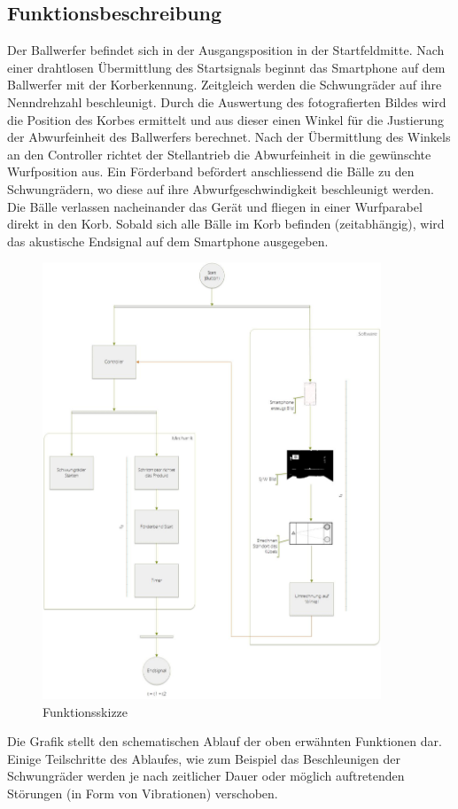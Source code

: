 \subsection{Funktionsbeschreibung}
Der Ballwerfer befindet sich in der Ausgangsposition in der Startfeldmitte. Nach einer drahtlosen Übermittlung des Startsignals beginnt das Smartphone auf dem Ballwerfer mit der Korberkennung. Zeitgleich werden die Schwungräder auf ihre Nenndrehzahl beschleunigt. Durch die Auswertung des fotografierten Bildes wird die Position des Korbes ermittelt und aus dieser einen Winkel für die Justierung der Abwurfeinheit des Ballwerfers berechnet. Nach der Übermittlung des Winkels an den Controller richtet der Stellantrieb die Abwurfeinheit in die gewünschte Wurfposition aus. Ein Förderband befördert anschliessend die Bälle zu den Schwungrädern, wo diese auf ihre Abwurfgeschwindigkeit beschleunigt werden. Die Bälle verlassen nacheinander das Gerät und fliegen in einer Wurfparabel direkt in den Korb. Sobald sich alle Bälle im Korb befinden (zeitabhängig), wird das akustische Endsignal auf dem Smartphone ausgegeben.
\begin{figure}[h!]
	\centering
	\includegraphics[width=0.9\textwidth]{Enddokumentation/Loesungskonzept/Bilder/FlowOnChart_v2.jpg}
	\caption{Funktionsskizze}
	\label{fig:FlowChart}
\end{figure}
Die Grafik stellt den schematischen Ablauf der oben erwähnten Funktionen dar. Einige Teilschritte des Ablaufes, wie zum Beispiel das Beschleunigen der Schwungräder werden je nach zeitlicher Dauer oder möglich auftretenden Störungen (in Form von Vibrationen) verschoben.